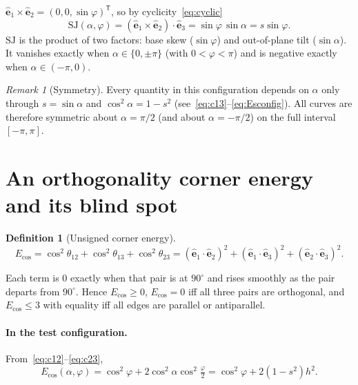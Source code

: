 \documentclass[11pt]{article}
\theoremstyle{definition}
\newtheorem{definition}{Definition}
\theoremstyle{remark}
\newtheorem{remark}{Remark}
\newcommand{\uv}[1]{\hat{\bm{#1}}}
\newcommand{\Eu}{E_{\cos}}
\newcommand{\SJ}{\mathrm{SJ}}
\begin{document}
$\uv{e}_1\times\uv{e}_2=(0,0,\sin\varphi)^{\mathsf T}$, so by cyclicity~\eqref{eq:cyclic}
\begin{equation}
  \boxed{\SJ(\alpha,\varphi)=(\uv{e}_1\times\uv{e}_2)\cdot\uv{e}_3=\sin\varphi\,\sin\alpha = s\sin\varphi.}
  \label{eq:SJconfig}
\end{equation}
$\SJ$ is the product of two factors: base skew ($\sin\varphi$) and out-of-plane tilt
($\sin\alpha$). It vanishes exactly when $\alpha\in\{0,\pm\pi\}$ (with $0<\varphi<\pi$) and is negative
exactly when $\alpha\in(-\pi,0)$.

\begin{remark}[Symmetry]
Every quantity in this configuration depends on $\alpha$ only through $s=\sin\alpha$ and
$\cos^2\alpha=1-s^2$ (see~\eqref{eq:c13}--\eqref{eq:Esconfig}). All curves are therefore symmetric
about $\alpha=\pi/2$ (and about $\alpha=-\pi/2$) on the full interval $[-\pi,\pi]$.
\end{remark}

\section{An orthogonality corner energy and its blind spot}

\begin{definition}[Unsigned corner energy]
\begin{equation}
  \boxed{\Eu=\cos^2\theta_{12}+\cos^2\theta_{13}+\cos^2\theta_{23}
   =(\uv{e}_1\cdot\uv{e}_2)^2+(\uv{e}_1\cdot\uv{e}_3)^2+(\uv{e}_2\cdot\uv{e}_3)^2.}
\end{equation}
\end{definition}

Each term is $0$ exactly when that pair is at $90^\circ$ and rises smoothly as the pair
departs from $90^\circ$. Hence $\Eu\ge0$, $\Eu=0$ iff all three pairs are orthogonal, and
$\Eu\le3$ with equality iff all edges are parallel or antiparallel.

\paragraph{In the test configuration.} From~\eqref{eq:c12}--\eqref{eq:c23},
\begin{equation}
  \Eu(\alpha,\varphi)=\cos^2\varphi+2\cos^2\alpha\cos^2\tfrac{\varphi}{2}
  =\cos^2\varphi+2(1-s^2)h^2.
  \label{eq:Euconfig}
\end{equation}
\end{document}
